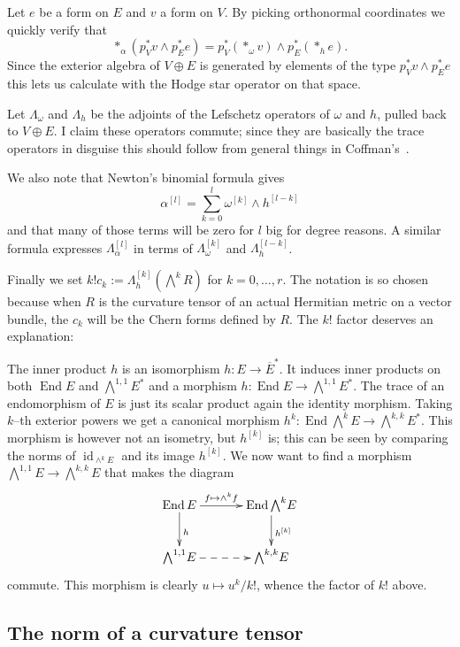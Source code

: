 \documentclass[11pt,a4paper]{amsart}
\def\^#1{^{[#1]}}
\DeclareMathOperator{\id}{id}
\DeclareMathOperator{\End}{End}
\theoremstyle{definition}
\numberwithin{equation}{section}
\begin{document}
Let $e$ be a form on $E$ and $v$ a form on $V$. By picking orthonormal
coordinates we quickly verify that
$$
*_\alpha(p_V^* v \wedge p_E^* e) 
= p_V^*(*_\omega v) \wedge p_E^*(*_h e).
$$
Since the exterior algebra of $V \oplus E$ is generated by elements of the
type $p_V^* v \wedge p_E^* e$ this lets us calculate with the Hodge star
operator on that space.

Let $\Lambda_\omega$ and $\Lambda_h$ be the adjoints of the Lefschetz
operators of $\omega$ and $h$, pulled back to $V \oplus E$. I claim these
operators commute; since they are basically the trace operators in disguise
this should follow from general things in Coffman's~\cite{Coffman}. 

We also note that Newton's binomial formula gives
$$
\alpha\^{l} = \sum_{k=0}^{l} \omega\^{k} \wedge h\^{l-k}
$$
and that many of those terms will be zero for $l$ big for degree
reasons. A similar formula expresses $\Lambda\^{l}_\alpha$ in terms of
$\Lambda\^{k}_\omega$ and $\Lambda\^{l-k}_h$.

Finally we set $k! c_k := \Lambda\^{k}_h (\bigwedge^k \! R)$ for $k = 0, \ldots,
r$.  The notation is so chosen because when $R$ is the curvature tensor of
an actual Hermitian metric on a vector bundle, the $c_k$ will be the Chern
forms defined by $R$. The $k!$ factor deserves an explanation:

The inner product $h$ is an isomorphism $h : E \to \overline E^*$. It
induces inner products on both $\End E$ and $\bigwedge^{1,1} \! E^*$ and a
morphism $h : \End E \to \bigwedge^{1,1} \! E^*$. The trace of an
endomorphism of $E$ is just its scalar product again the identity morphism.
Taking $k$--th exterior powers we get a canonical morphism $h^k : \End
\bigwedge^k \! E \to \bigwedge^{k,k} \! E^*$. This morphism is however not
an isometry, but $h\^k$ is; this can be seen by comparing the norms of
$\id_{\wedge^k E}$ and its image $h\^k$. We now want to find a morphism
$\bigwedge^{1,1} \! E \to \bigwedge^{k,k} \! E$ that makes the diagram
$$
\xymatrix@C+10pt{
    \End E \ar[r]^-{f \mapsto \wedge^k f} \ar[d]^{h} & 
    \End \bigwedge^{k} \! E \ar[d]^{h\^k} \\
    \bigwedge^{1,1} \! E \ar@{-->}[r] 
    & \bigwedge^{k,k} \! E
}
$$
commute. This morphism is clearly $u \mapsto u^k / k!$, whence the factor
of $k!$ above.



\subsection*{The norm of a curvature tensor}
\end{document}
